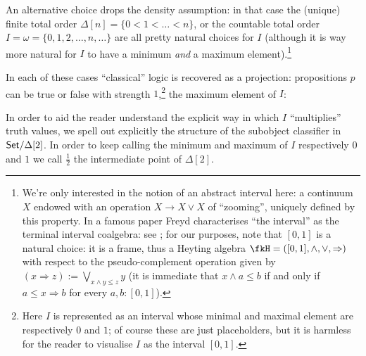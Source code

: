 An alternative choice drops the density assumption: in that case the (unique) finite total order $\Delta[n] = \{0 < 1 <\dots < n\}$, or the countable total order $I=\omega = \{0,1,2,\dots,n,\dots\}$ are all pretty natural choices for $I$ (although it is way more natural for $I$ to have a minimum \emph{and} a maximum element).\footnote{We're only interested in the notion of an abstract interval here: a continuum $X$ endowed with an operation $X \to X \vee X$ of ``zooming'', uniquely defined by this property. In a famous paper Freyd characterises ``the interval'' as the terminal interval coalgebra: see \cite[§1]{freyd2008algebraic}; for our purposes, note that $[0,1]$ is a natural choice: it is a frame, thus a Heyting algebra $\fkH =([0,1],\land,\lor,\Rightarrow)$ with respect to the pseudo-complement operation given by $(x \Rightarrow z) := \bigvee_{x\land y \le z} y$ (it is immediate that $x \land a \le b$ if and only if $a \le x \Rightarrow b$ for every $a,b: [0,1]$).}
\begin{remark}\label{fig_Omega}
  In each of these cases ``classical'' logic is recovered as a projection: propositions $p$ can be true or false with strength $1$,\footnote{Here $I$ is represented as an interval whose minimal and maximal element are respectively $0$ and $1$; of course these are just placeholders, but it is harmless for the reader to visualise $I$ as the interval $[0,1]$.} the maximum element of $I$:
  \begin{center}
  \end{center}
\end{remark}
In order to aid the reader understand the explicit way in which $I$ ``multiplies'' truth values, we spell out explicitly the structure of the subobject classifier in $\mathsf{Set}/\Delta[2]$. In order to keep calling the minimum and maximum of $I$ respectively $0$ and $1$ we call $\frac{1}{2}$ the intermediate point of $\Delta[2]$.
